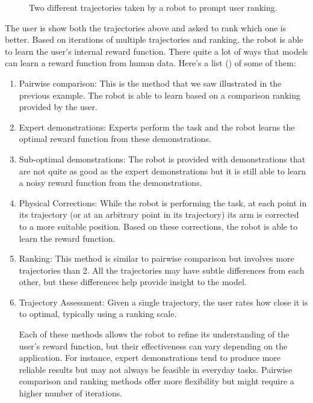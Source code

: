 \documentclass[
  letterpaper,
  numbers=noenddot,
  DIV=11]{scrreprt}
\theoremstyle{definition}
\theoremstyle{plain}
\theoremstyle{plain}
\theoremstyle{remark}
\begin{document}
\begin{figure}


\caption{\label{fig-reward-robot-1}Two different trajectories taken by a
robot to prompt user ranking.}

\end{figure}%

The user is show both the trajectories above and asked to rank which one
is better. Based on iterations of multiple trajectories and ranking, the
robot is able to learn the user's internal reward function. There quite
a lot of ways that models can learn a reward function from human data.
Here's a list () of
some of them:

\begin{enumerate}
\def\labelenumi{\arabic{enumi}.}
\item
  Pairwise comparison: This is the method that we saw illustrated in the
  previous example. The robot is able to learn based on a comparison
  ranking provided by the user.
\item
  Expert demonstrations: Experts perform the task and the robot learns
  the optimal reward function from these demonstrations.
\item
  Sub-optimal demonstrations: The robot is provided with demonstrations
  that are not quite as good as the expert demonstrations but it is
  still able to learn a noisy reward function from the demonstrations.
\item
  Physical Corrections: While the robot is performing the task, at each
  point in its trajectory (or at an arbitrary point in its trajectory)
  its arm is corrected to a more suitable position. Based on these
  corrections, the robot is able to learn the reward function.
\item
  Ranking: This method is similar to pairwise comparison but involves
  more trajectories than 2. All the trajectories may have subtle
  differences from each other, but these differences help provide
  insight to the model.
\item
  Trajectory Assessment: Given a single trajectory, the user rates how
  close it is to optimal, typically using a ranking scale.

  Each of these methods allows the robot to refine its understanding of
  the user's reward function, but their effectiveness can vary depending
  on the application. For instance, expert demonstrations tend to
  produce more reliable results but may not always be feasible in
  everyday tasks. Pairwise comparison and ranking methods offer more
  flexibility but might require a higher number of iterations.
\end{enumerate}
\end{document}
